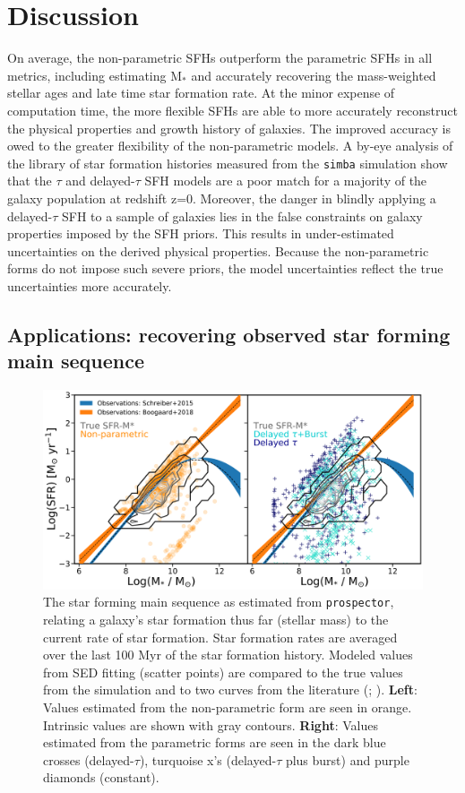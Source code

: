 \documentclass[twocolumn]{aastex62}
\begin{document}
\section{Discussion}

On average, the non-parametric SFHs outperform the parametric SFHs in all metrics, including estimating M$_*$ and accurately recovering the mass-weighted stellar ages and late time star formation rate. At the minor expense of computation time, the more flexible SFHs are able to more accurately reconstruct the physical properties and growth history of galaxies. The improved accuracy is owed to the greater flexibility of the non-parametric models. A by-eye analysis of the library of star formation histories measured from the \texttt{simba} simulation show that the $\tau$ and delayed-$\tau$ SFH models are a poor match for a majority of the galaxy population at redshift z=0. Moreover, the danger in blindly applying a delayed-$\tau$ SFH to a sample of galaxies lies in the false constraints on galaxy properties imposed by the SFH priors. This results in under-estimated uncertainties on the derived physical properties. Because the non-parametric forms do not impose such severe priors, the model uncertainties reflect the true uncertainties more accurately. 


\subsection{Applications: recovering observed star forming main sequence}\label{section:MS}

\begin{figure}[t]

\centering
\includegraphics[width=\textwidth]{MS_twopanel.png}\hfill

\caption{The star forming main sequence as estimated from \texttt{prospector}, relating a galaxy's star formation thus far (stellar mass) to the current rate of star formation. Star formation rates are averaged over the last 100 Myr of the star formation history. Modeled values from SED fitting (scatter points) are compared to the true values from the simulation and to two curves from the literature (\cite{schreiber_herschel_2015}; \cite{boogaard_muse_2018}). \textbf{Left}: Values estimated from the non-parametric form are seen in orange. Intrinsic values are shown with gray contours. \textbf{Right}: Values estimated from the parametric forms are seen in the dark blue crosses (delayed-$\tau$), turquoise x's (delayed-$\tau$ plus burst) and purple diamonds (constant).}
\label{fig:sfms}
\end{figure}
\end{document}
